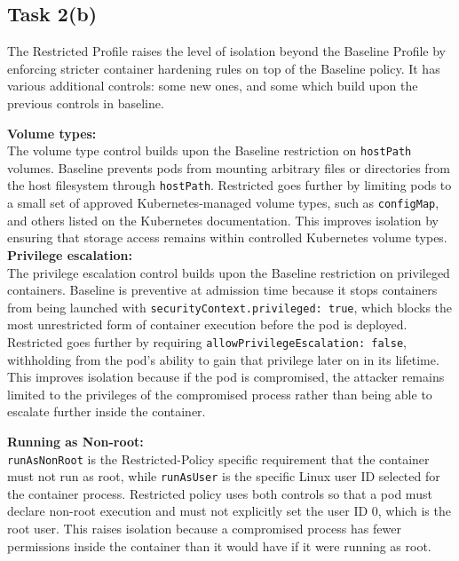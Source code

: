 \documentclass[11pt,a4paper]{article}
\begin{document}
	\subsection{Task 2(b)}
	
	The Restricted Profile raises the level of isolation beyond the Baseline Profile by enforcing stricter container hardening rules on top of the Baseline policy. It has various additional controls: some new ones, and some which build upon the previous controls in baseline.
	
	
	\textbf{Volume types:} \\
	The volume type control builds upon the Baseline restriction on \texttt{hostPath} volumes. Baseline prevents pods from mounting arbitrary files or directories from the host filesystem through \texttt{hostPath}. Restricted goes further by limiting pods to a small set of approved Kubernetes-managed volume types, such as \texttt{configMap}, and others listed on the Kubernetes documentation\cite{kubernetes documentation}. This improves isolation by ensuring that storage access remains within controlled Kubernetes volume types.\\
	
	\textbf{Privilege escalation:}\\
	The privilege escalation control builds upon the Baseline restriction on privileged containers. Baseline is preventive at admission time because it stops containers from being launched with \texttt{securityContext.privileged: true}, which blocks the most unrestricted form of container execution before the pod is deployed. Restricted goes further by requiring \texttt{allowPrivilegeEscalation: false}, withholding from the pod's ability to gain that privilege later on in its lifetime. This improves isolation because if the pod is compromised, the attacker remains limited to the privileges of the compromised process rather than being able to escalate further inside the container.
	
	\textbf{Running as Non-root:}\\
	\texttt{runAsNonRoot} is the Restricted-Policy specific requirement that the container must not run as root, while \texttt{runAsUser} is the specific Linux user ID selected for the container process. Restricted policy uses both controls so that a pod must declare non-root execution and must not explicitly set the user ID 0, which is the root user. This raises isolation because a compromised process has fewer permissions inside the container than it would have if it were running as root.
	
\end{document}
